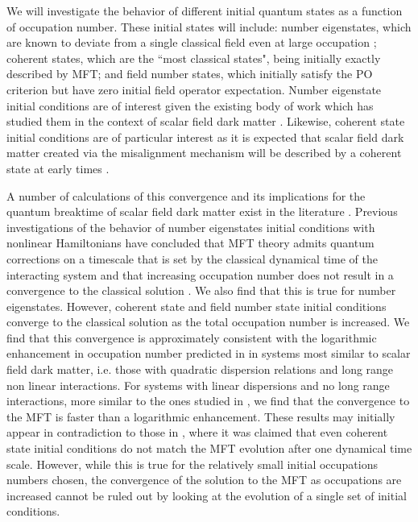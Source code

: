 \documentclass[aps,prd,twocolumn,superscriptaddress]{revtex4-1}
\begin{document}
We will investigate the behavior of different initial quantum states as a function of occupation number. These initial states will include: number eigenstates, which are known to deviate from a single classical field even at large occupation \cite{Sikivie2017, Hertzberg2016, chakrabarty2021}; coherent states, which are the ``most classical states", being initially exactly described by MFT; and field number states, which initially satisfy the PO criterion but have zero initial field operator expectation. Number eigenstate initial conditions are of interest given the existing body of work which has studied them in the context of scalar field dark matter \cite{Sikivie2017, Hertzberg2016, chakrabarty2021}.
Likewise, coherent state initial conditions are of particular interest as it is expected that scalar field dark matter created via the misalignment mechanism will be described by a coherent state at early times \cite{ABBOTT1983133, Preskill:1982}. 

A number of calculations of this convergence and its implications for the quantum breaktime of scalar field dark matter exist in the literature \cite{Sikivie2017, Chakrabarty:2017fkd, Hertzberg2016}.
Previous investigations of the behavior of number eigenstates initial conditions with nonlinear Hamiltonians have concluded that MFT theory admits quantum corrections on a timescale that is set by the classical dynamical time of the interacting system and that increasing occupation number does not result in a convergence to the classical solution \cite{Sikivie2017}. 
We also find that this is true for number eigenstates. However, coherent state and field number state initial conditions converge to the classical solution as the total occupation number is increased. We find that this convergence is approximately consistent with the logarithmic enhancement in occupation number predicted in \cite{Hertzberg2016, Albrecht2014} in systems most similar to scalar field dark matter, i.e. those with quadratic dispersion relations and long range non linear interactions. For systems with linear dispersions and no long range interactions, more similar to the ones studied in \cite{Sikivie2017, Erken2012, Hertzberg2016}, we find that the convergence to the MFT is faster than a logarithmic enhancement. These results may initially appear in contradiction to those in \cite{Sikivie2017}, where it was claimed that even coherent state initial conditions do not match the MFT evolution after one dynamical time scale. However, while this is true for the relatively small initial occupations numbers chosen, the convergence of the solution to the MFT as occupations are increased cannot be ruled out by looking at the evolution of a single set of initial conditions. 
\end{document}
